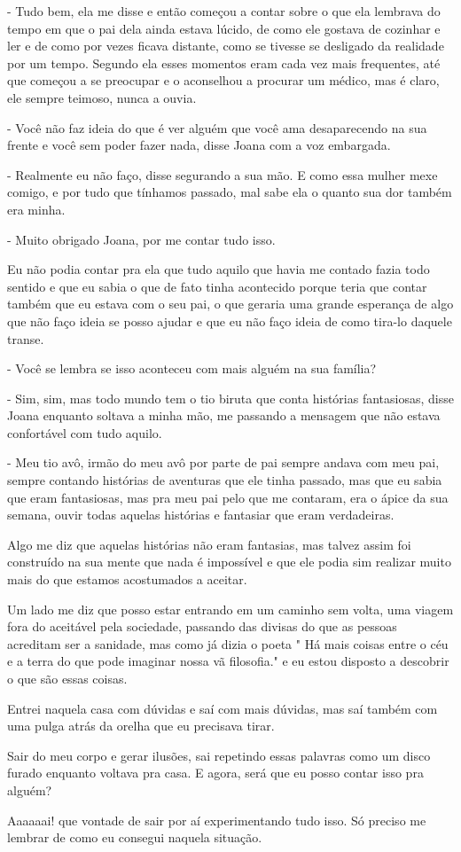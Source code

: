 - Tudo bem, ela me disse e então começou a contar sobre o que ela lembrava do tempo em que o pai dela ainda estava lúcido, de como ele gostava de cozinhar e ler e de como por vezes ficava distante, como se tivesse se desligado da realidade por um tempo. Segundo ela esses momentos eram cada vez mais frequentes, até que começou a se preocupar e o aconselhou a procurar um médico, mas é claro, ele sempre teimoso, nunca a ouvia.

- Você não faz ideia do que é ver alguém que você ama desaparecendo na sua frente e você sem poder fazer nada, disse Joana com a voz embargada.

- Realmente eu não faço, disse segurando a sua mão. E como essa mulher mexe comigo, e por tudo que tínhamos passado, mal sabe ela o quanto sua dor também era minha.

- Muito obrigado Joana, por me contar tudo isso.

Eu não podia contar pra ela que tudo aquilo que havia me contado fazia todo sentido e que eu sabia o que de fato tinha acontecido porque teria que contar também que eu estava com o seu pai, o que geraria uma grande esperança de algo que não faço ideia se posso ajudar e que eu não faço ideia de como tira-lo daquele transe.

- Você se lembra se isso aconteceu com mais alguém na sua família?

- Sim, sim, mas todo mundo tem o tio biruta que conta histórias fantasiosas, disse Joana enquanto soltava a minha mão, me passando a mensagem que não estava confortável com tudo aquilo.

- Meu tio avô, irmão do meu avô por parte de pai sempre andava com meu pai, sempre contando histórias de aventuras que ele tinha passado, mas que eu sabia que eram fantasiosas, mas pra meu pai pelo que me contaram, era o ápice da sua semana, ouvir todas aquelas histórias e fantasiar que eram verdadeiras.

Algo me diz que aquelas histórias não eram fantasias, mas talvez assim foi construído na sua mente que nada é impossível e que ele podia sim realizar muito mais do que estamos acostumados a aceitar.

Um lado me diz que posso estar entrando em um caminho sem volta, uma viagem fora do aceitável pela sociedade, passando das divisas do que as pessoas acreditam ser a sanidade, mas como já dizia o poeta " Há mais coisas entre o céu e a terra do que pode imaginar nossa vã filosofia." e eu estou disposto a descobrir o que são essas coisas.

Entrei naquela casa com dúvidas e saí com mais dúvidas, mas saí também com uma pulga atrás da orelha que eu precisava tirar. 

Sair do meu corpo e gerar ilusões, sai repetindo essas palavras como um disco furado enquanto voltava pra casa. E agora, será que eu posso contar isso pra alguém?

Aaaaaai! que vontade de sair por aí experimentando tudo isso. Só preciso me lembrar de como eu consegui naquela situação.


